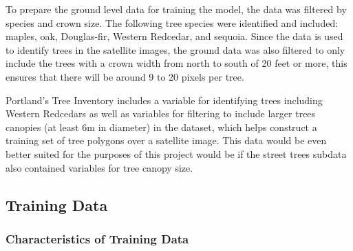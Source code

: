 \documentclass[12pt,twoside]{reedthesis}
\begin{document}
To prepare the ground level data for training the model, the data was filtered by species and crown size. The following tree species were identified and included: maples, oak, Douglas-fir, Western Redcedar, and sequoia. Since the data is used to identify trees in the satellite images, the ground data was also filtered to only include the trees with a crown width from north to south of 20 feet or more, this ensures that there will be around 9 to 20 pixels per tree.

Portland's Tree Inventory includes a variable for identifying trees including Western Redcedars as well as variables for filtering to include larger trees canopies (at least 6m in diameter) in the dataset, which helps construct a training set of tree polygons over a satellite image. This data would be even better suited for the purposes of this project would be if the street trees subdata also contained variables for tree canopy size.

\hypertarget{training-data}{%
\subsection{Training Data}\label{training-data}}

\hypertarget{characteristics-of-training-data}{%
\subsubsection{Characteristics of Training Data}\label{characteristics-of-training-data}}
\end{document}
